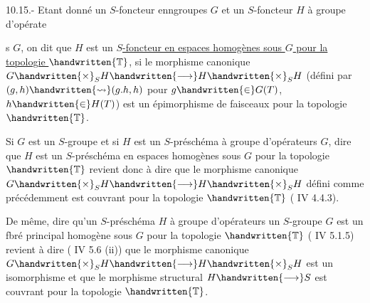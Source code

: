  10.15.- Etant donné un $S$-foncteur enngroupes $G$ et un $S$-foncteur $H$ à groupe d'opérates $G$, on dit que $H$ est un \uline{$S$-foncteur en espaces homogènes sous $G$ pour la topologie $\handwritten{\mathbb{T}}$}, si le morphisme canonique $G\handwritten{\times}_S H\handwritten{\longrightarrow}H\handwritten{\times}_S H$ (défini par $(g,h)\handwritten{\rightsquigarrow}(g.h,h)$ pour $g\handwritten{\in}G(T)$, $h\handwritten{\in}H(T)$) est un épimorphisme de faisceaux pour la topologie $\handwritten{\mathbb{T}}$.

Si $G$ est un $S$-groupe et si $H$ est un $S$-préschéma à  groupe d'opérateurs $G$, dire que $H$ est un $S$-préschéma en espaces homogènes sous $G$ pour la topologie $\handwritten{\mathbb{T}}$ revient donc à dire que le morphisme canonique $G\handwritten{\times}_S H\handwritten{\longrightarrow}H\handwritten{\times}_S H$ défini comme précédemment est couvrant pour la topologie $\handwritten{\mathbb{T}}$ ( IV 4.4.3).

De même, dire qu'un $S$-préschéma $H$ à groupe d'opérateurs un $S$-groupe $G$ est un fbré principal homogène sous $G$ pour la topologie $\handwritten{\mathbb{T}}$ ( IV 5.1.5) revient à dire ( IV 5.6 (ii)) que le morphisme canonique $G\handwritten{\times}_S H\handwritten{\longrightarrow}H\handwritten{\times}_S H$ est un isomorphisme et que le morphisme structural $H\handwritten{\longrightarrow}S$ est couvrant pour la topologie $\handwritten{\mathbb{T}}$.

